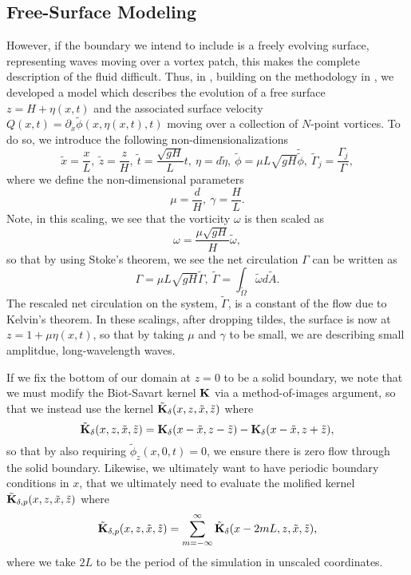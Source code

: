 \documentclass[a4paper,11pt]{article}
\newcommand{\p}{\partial}
\begin{document}
\subsection*{Free-Surface Modeling}
However, if the boundary we intend to include is a freely evolving surface, representing waves moving over a vortex patch, this makes the complete description of the fluid difficult.  Thus, in \cite{curtis}, building on the methodology in \cite{afm}, we developed a model which describes the evolution of a free surface $z=H + \eta(x,t)$ and the associated surface velocity $Q(x,t) = \p_{x} \tilde{\phi}(x,\eta(x,t),t)$ moving over a collection of $N$-point vortices.  To do so, we introduce the following non-dimensionalizations
\[
\tilde{x} = \frac{x}{L}, ~\tilde{z} = \frac{z}{H}, ~ \tilde{t} = \frac{\sqrt{gH}}{L} t, ~ \eta = d\tilde{\eta}, ~ \tilde{\phi} = \mu L\sqrt{gH} \tilde{\tilde{\phi}}, ~ \tilde{\Gamma}_{j} = \frac{\Gamma_{j}}{\Gamma},
\]
where we define the non-dimensional parameters
\[
\mu= \frac{d}{H}, ~ \gamma = \frac{H}{L}.  
\]
Note, in this scaling, we see that the vorticity $\omega$ is then scaled as 
\[
\omega = \frac{\mu \sqrt{gH}}{H}\tilde{\omega},
\]
so that by using Stoke's theorem, we see the net circulation $\Gamma$ can be written as 
\[
\Gamma = \mu L \sqrt{gH} \tilde{\Gamma}, ~ \tilde{\Gamma} = \int_{ \tilde{\Omega} } \tilde{\omega} d\tilde{A}.
\]
The rescaled net circulation on the system, $\tilde{\Gamma}$, is a constant of the flow due to Kelvin's theorem.  In these scalings, after dropping tildes, the surface is now at $z = 1 + \mu \eta(x,t)$,  so that by taking $\mu$ and $\gamma$ to be small, we are describing small amplitdue, long-wavelength waves.  

If we fix the bottom of our domain at $z=0$ to be a solid boundary, we note that we must modify the Biot-Savart kernel ${\bf K}$ via a method-of-images argument, so that we instead use the kernel $\tilde{{\bf K}}_{\delta}(x,z,\tilde{x},\tilde{z})$ where 
\[
\tilde{{\bf K}}_{\delta}(x,z,\tilde{x},\tilde{z}) = {\bf K}_{\delta}(x-\tilde{x},z-\tilde{z}) - {\bf K}_{\delta}(x-\tilde{x},z+\tilde{z}),
\]
so that by also requiring $\tilde{\phi}_{z}(x,0,t)=0$, we ensure there is zero flow through the solid boundary.  Likewise, we ultimately want to have periodic boundary conditions in $x$, that we ultimately need to evaluate the molified kernel $\tilde{{\bf K}}_{\delta,p}(x,z,\tilde{x},\tilde{z})$ where
\[
\tilde{{\bf K}}_{\delta,p}(x,z,\tilde{x},\tilde{z}) = \sum_{m=-\infty}^{\infty} \tilde{{\bf K}}_{\delta}(x-2mL,z,\tilde{x},\tilde{z}),
\]
where we take $2L$ to be the period of the simulation in unscaled coordinates.  
\end{document}
